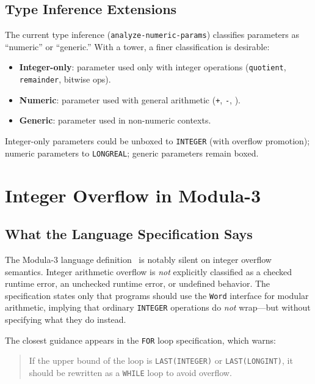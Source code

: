 \documentclass[12pt]{report}
\begin{document}
\subsection{Type Inference Extensions}

The current type inference ({\tt analyze-numeric-params}) classifies
parameters as ``numeric'' or ``generic.''  With a tower, a finer
classification is desirable:

\begin{itemize}
\item \textbf{Integer-only}: parameter used only with integer
  operations ({\tt quotient}, {\tt remainder}, bitwise ops).
\item \textbf{Numeric}: parameter used with general arithmetic
  ({\tt +}, {\tt -}, {\tt *}).
\item \textbf{Generic}: parameter used in non-numeric contexts.
\end{itemize}

Integer-only parameters could be unboxed to {\tt INTEGER} (with
overflow promotion); numeric parameters to {\tt LONGREAL}; generic
parameters remain boxed.

\section{Integer Overflow in Modula-3}
\label{sec:overflow}

\subsection{What the Language Specification Says}

The Modula-3 language definition~\cite{spwm3,m3defn} is notably
silent on integer overflow semantics.  Integer arithmetic overflow
is \emph{not} explicitly classified as a checked runtime error, an
unchecked runtime error, or undefined behavior.  The specification
states only that programs should use the {\tt Word} interface for
modular arithmetic, implying that ordinary {\tt INTEGER} operations
do \emph{not} wrap---but without specifying what they do instead.

The closest guidance appears in the {\tt FOR} loop specification,
which warns:

\begin{quote}
  If the upper bound of the loop is {\tt LAST(INTEGER)} or
  {\tt LAST(LONGINT)}, it should be rewritten as a {\tt WHILE}
  loop to avoid overflow.
\end{quote}
\end{document}

